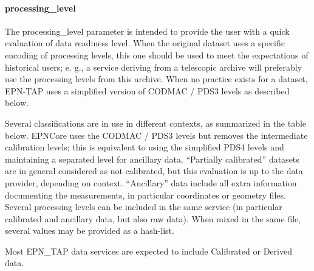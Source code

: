 \documentclass[11pt,a4paper]{ivoa}
\begin{document}
\paragraph{processing\_level}

The processing\_level parameter is intended to provide the user with a quick evaluation of data readiness level. When the original dataset uses a specific encoding of processing levels, this one should be used to meet the expectations of historical users; e. g., a service deriving from a telescopic archive will preferably use the processing levels from this archive. When no practice exists for a dataset, EPN-TAP uses a simplified version of CODMAC / PDS3 levels as described below.

Several classifications are in use in different contexts, as summarized in the table below.  EPNCore uses the CODMAC / PDS3 levels but removes the intermediate calibration levels; this is equivalent to using the simplified PDS4 levels and maintaining a separated level for ancillary data. ``Partially calibrated'' datasets are in general considered as not calibrated, but this evaluation is up to the data provider, depending on context. ``Ancillary'' data include all extra information documenting the measurements, in particular coordinates or geometry files. Several processing levels can be included in the same service (in particular calibrated and ancillary data, but also raw data). When mixed in the same file, several values may be provided as a hash-list.

Most EPN\_TAP data services are expected to include Calibrated or Derived data. 
\end{document}
